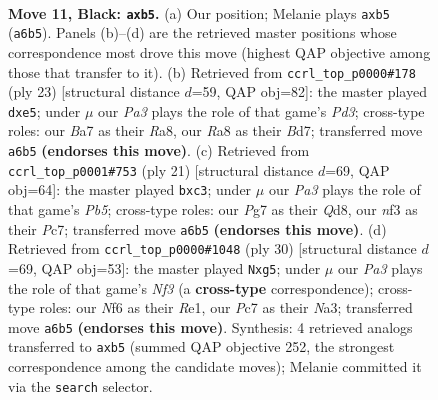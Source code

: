 \documentclass[11pt]{article}
\begin{document}
\clearpage

\begin{figure}[p]\centering
\begin{subfigure}{0.46\textwidth}\centering
\resizebox{\linewidth}{!}{%
\newchessgame
\chessboard[
  setfen={r1bq1rk1/bpp2pp1/p1np1n1p/1P2p2P/P1B1P3/2PP1N2/5PP1/RNBQ1RK1 b - - 0 11},
  showmover=false,
  pgfstyle=straightmove, color=movearrow, markmove={a6-b5}
]}
\caption{}
\end{subfigure}\hfill
\begin{subfigure}{0.46\textwidth}\centering
\resizebox{\linewidth}{!}{%
\newchessgame
\chessboard[
  setfen={r2q1rk1/3bppbp/p2p1np1/npp1P3/P7/2PP1N1P/BP3PP1/RNBQR1K1 b - - 0 12},
  showmover=false,
  pgfstyle=straightmove, color=movearrow, markmove={d6-e5}
]}
\caption{}
\end{subfigure}
\\[4pt]
\begin{subfigure}{0.46\textwidth}\centering
\resizebox{\linewidth}{!}{%
\newchessgame
\chessboard[
  setfen={r1bq1rk1/b1p2ppp/p1np1n2/4p3/Pp1PP3/1BP1BN1P/1P3PP1/RN1Q1RK1 b - - 2 11},
  showmover=false,
  pgfstyle=straightmove, color=movearrow, markmove={b4-c3}
]}
\caption{}
\end{subfigure}\hfill
\begin{subfigure}{0.46\textwidth}\centering
\resizebox{\linewidth}{!}{%
\newchessgame
\chessboard[
  setfen={rn3rk1/1p1bqp2/2pp1n1p/p1bPp1p1/P3P2B/N1PB1N1P/1P3PP1/R2QR1K1 w - - 0 16},
  showmover=false,
  pgfstyle=straightmove, color=movearrow, markmove={f3-g5}
]}
\caption{}
\end{subfigure}
\caption{\textbf{Move 11, Black: \texttt{axb5}.} (a) Our position; Melanie plays \texttt{axb5} (\texttt{a6b5}). Panels (b)--(d) are the retrieved master positions whose correspondence most drove this move (highest QAP objective among those that transfer to it). (b) Retrieved from \texttt{ccrl\_top\_p0000\#178} (ply 23) [structural distance $d$=59, QAP obj=82]: the master played \texttt{dxe5}; under $\mu$ our \emph{Pa3} plays the role of that game's \emph{Pd3}; cross-type roles: our \emph{B}a7 as their \emph{R}a8, our \emph{R}a8 as their \emph{B}d7; transferred move \texttt{a6b5} \textbf{(endorses this move)}. (c) Retrieved from \texttt{ccrl\_top\_p0001\#753} (ply 21) [structural distance $d$=69, QAP obj=64]: the master played \texttt{bxc3}; under $\mu$ our \emph{Pa3} plays the role of that game's \emph{Pb5}; cross-type roles: our \emph{P}g7 as their \emph{Q}d8, our \emph{n}f3 as their \emph{P}c7; transferred move \texttt{a6b5} \textbf{(endorses this move)}. (d) Retrieved from \texttt{ccrl\_top\_p0000\#1048} (ply 30) [structural distance $d$=69, QAP obj=53]: the master played \texttt{Nxg5}; under $\mu$ our \emph{Pa3} plays the role of that game's \emph{Nf3} (a \textbf{cross-type} correspondence); cross-type roles: our \emph{N}f6 as their \emph{R}e1, our \emph{P}c7 as their \emph{N}a3; transferred move \texttt{a6b5} \textbf{(endorses this move)}. Synthesis: 4 retrieved analogs transferred to \texttt{axb5} (summed QAP objective 252, the strongest correspondence among the candidate moves); Melanie committed it via the \texttt{search} selector.}
\label{fig:thought-m21}
\end{figure}
\end{document}

